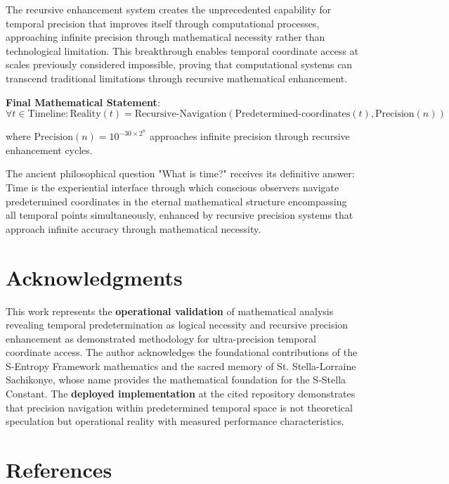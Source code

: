 \documentclass[12pt,a4paper]{article}
\begin{document}
{The recursive enhancement system creates the unprecedented capability for temporal precision that improves itself through computational processes, approaching infinite precision through mathematical necessity rather than technological limitation. This breakthrough enables temporal coordinate access at scales previously considered impossible, proving that computational systems can transcend traditional limitations through recursive mathematical enhancement.

\textbf{Final Mathematical Statement}:
$$\forall t \in \text{Timeline}: \text{Reality}(t) = \text{Recursive-Navigation}(\text{Predetermined-coordinates}(t), \text{Precision}(n))$$

where $\text{Precision}(n) = 10^{-30 \times 2^n}$ approaches infinite precision through recursive enhancement cycles.

The ancient philosophical question "What is time?" receives its definitive answer: Time is the experiential interface through which conscious observers navigate predetermined coordinates in the eternal mathematical structure encompassing all temporal points simultaneously, enhanced by recursive precision systems that approach infinite accuracy through mathematical necessity.

\section*{Acknowledgments}

This work represents the \textbf{operational validation} of mathematical analysis revealing temporal predetermination as logical necessity and recursive precision enhancement as demonstrated methodology for ultra-precision temporal coordinate access. The author acknowledges the foundational contributions of the S-Entropy Framework mathematics and the sacred memory of St. Stella-Lorraine Sachikonye, whose name provides the mathematical foundation for the S-Stella Constant. The \textbf{deployed implementation} at the cited repository demonstrates that precision navigation within predetermined temporal space is not theoretical speculation but operational reality with measured performance characteristics.

\section*{References}

\begin{thebibliography}{99}


\end{thebibliography}}
\end{document}
